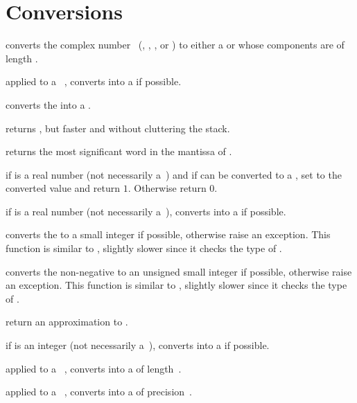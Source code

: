 \section{Conversions}


 converts the complex number~
(, , ,  or ) to either
a  or  whose components are  of length
.

 applied to a ~, converts 
into a  if possible.

 converts the   into a
.

 returns , but
faster and without cluttering the stack.

 returns the most significant word
in the mantissa of .

 if  is a real number (not
necessarily a~) and if  can be converted to a
, set  to the converted value and return $1$.
Otherwise return $0$.

 if  is a real number (not necessarily
a~), converts  into a  if possible.

 converts the   to a small
integer if possible, otherwise raise an exception. This function
is similar to , slightly slower since it checks the type of .

 converts the non-negative   to
an unsigned small integer if possible, otherwise raise an exception. This
function is similar to , slightly slower since it checks the type
of .

 return an approximation to .

 if  is an integer (not necessarily
a~), converts  into a  if possible.

 applied to a ~, converts
 into a  of length~.

 applied to a ~, converts
 into a  of precision~.

